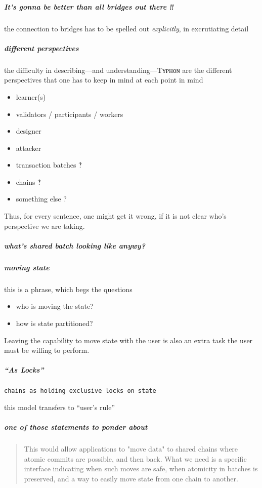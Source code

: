 \documentclass{article}
\theoremstyle{definition}
\begin{document}
\subparagraph{It's gonna be better than all bridges out there ‼}
the connection to bridges has to be spelled out \emph{explicitly},
in excrutiating detail

\subparagraph{different perspectives}
the difficulty in describing---and understanding---Tʏᴘʜᴏɴ
are the different perspectives that one has to keep in mind at each point in mind
\begin{itemize}
\item learner(s)
\item validators / participants / workers
\item designer
\item attacker
\item transaction batches ‽
\item chains ‽
\item something else ?
\end{itemize}
Thus, for every sentence, 
one might get it wrong,
if it is not clear who's perspective we are taking. 


\subparagraph{what's shared batch looking like anywy?}

\subparagraph{moving state}
this is a phrase, 
which begs the questions
\begin{itemize}
\item who is moving the state?
\item how is state partitioned?
\end{itemize}

Leaving the capability to move state with the user
is also an extra task the user must be willing to perform. 

\subparagraph{“As Locks”}

\texttt{chains as holding exclusive locks on state}

this model transfers to “user's rule”





\subparagraph{one of those statements to ponder about}

\begin{quote}
  This would allow applications to "move data" to shared chains where atomic commits are possible, and then back. What we need is a specific interface indicating when such moves are safe, when atomicity in batches is preserved, and a way to easily move state from one chain to another.
\end{quote}
\end{document}
